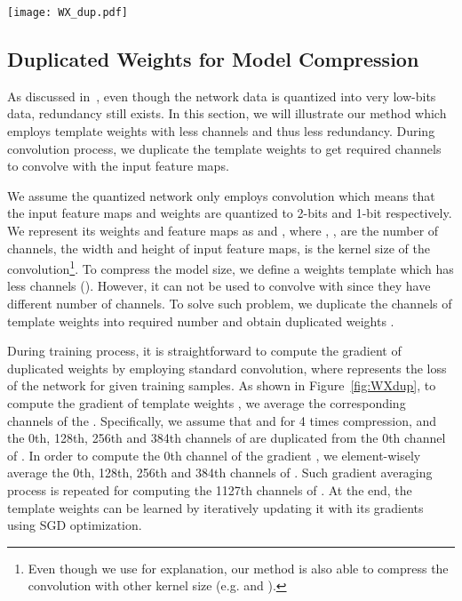 \documentclass[10pt,twocolumn,letterpaper]{article}
\begin{document}
\begin{figure*}[!htb]
	\centering
	\texttt{[image: WX\_dup.pdf]}
	
	\caption{Illustration of the forward and backward pass for both duplicated weights and feature maps duplication.}
	\label{fig:WXdup}
\end{figure*}


\subsection{Duplicated Weights for Model Compression}\label{subSec:Wdup}
As discussed in~\cite{BNNPrune}, even though the network data is quantized into very low-bits data, redundancy still exists. In this section, we will illustrate our method which employs template weights with less channels and thus less redundancy. During convolution process, we duplicate the template weights to get required channels to convolve with the input feature maps.

We assume the quantized network only employs  convolution which means that the input feature maps and weights are quantized to 2-bits and 1-bit respectively. We represent its weights and feature maps as  and , where , ,  are the number of channels, the width and height of input feature maps,  is the kernel size of the convolution\footnote{Even though we use  for explanation, our method is also able to compress the convolution with other kernel size (e.g.  and ). }. To compress the model size, we define a weights template  which has less channels (). However, it can not be used to convolve with  since they have different number of channels. To solve such problem, we duplicate the channels of template weights into required number and obtain duplicated weights .

During training process, it is straightforward to compute the gradient of duplicated weights  by employing standard convolution, where  represents the loss of the network for given training samples. As shown in Figure~\ref{fig:WXdup}, to compute the gradient of template weights , we average the corresponding channels of the . Specifically, we assume that  and  for 4 times compression, and the 0th, 128th, 256th and 384th channels of  are duplicated from the 0th channel of .  In order to compute the 0th channel of the gradient , we element-wisely average the 0th, 128th, 256th and 384th channels of . Such gradient averaging process is repeated for computing the 1127th channels of . At the end, the template weights  can be learned by iteratively updating it with its gradients  using SGD optimization.
\end{document}
